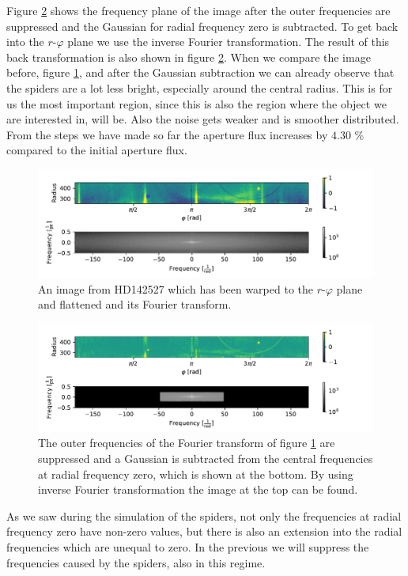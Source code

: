 Figure \ref{fig:HDcentralfreq_R254_R454_-1to1} shows the frequency plane of the image after the outer frequencies are suppressed and the Gaussian for radial frequency zero is subtracted. To get back into the $r$-$\varphi$ plane we use the inverse Fourier transformation. The result of this back transformation is also shown in figure \ref{fig:HDcentralfreq_R254_R454_-1to1}. When we compare the image before, figure \ref{fig:HDflatten_R254_R454_-1to1}, and after the Gaussian subtraction we can already observe that the spiders are a lot less bright, especially around the central radius. This is for us the most important region, since this is also the region where the object we are interested in, will be. Also the noise gets weaker and is smoother distributed. \\
From the steps we have made so far the aperture flux increases by $4.30$ \% compared to the initial aperture flux. 
\begin{figure}[H]
	\centering
		\includegraphics[width=1.0\textwidth]{pics/HDflatten_R254_R454_-1to1.pdf}
		\caption{An image from HD142527 which has been warped to the $r$-$\varphi$ plane and flattened and its Fourier transform.}
		\label{fig:HDflatten_R254_R454_-1to1}
\end{figure}
\begin{figure}[H]
	\centering
		\includegraphics[width=1.0\textwidth]{pics/HDcentralfreq_R254_R454_-1to1.pdf}
		\caption{The outer frequencies of the Fourier transform of figure \ref{fig:HDflatten_R254_R454_-1to1} are suppressed and a Gaussian is subtracted from the central frequencies at radial frequency zero, which is shown at the bottom. By using inverse Fourier transformation the image at the top can be found.}
		\label{fig:HDcentralfreq_R254_R454_-1to1}
\end{figure}

As we saw during the simulation of the spiders, not only the frequencies at radial frequency zero have non-zero values, but there is also an extension into the radial frequencies which are unequal to zero. In the previous we will suppress the frequencies caused by the spiders, also in this regime.